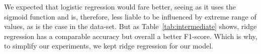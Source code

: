\documentclass[10pt,conference,compsocconf]{IEEEtran}
\begin{document}
\begin{comment}
\begin{table}[ht]
\centering
\resizebox{\columnwidth}{!}{%
\begin{tabular}{lrrr|r|r|r|}
\cline{5-7}
 &
  \multicolumn{1}{c}{} &
  \multicolumn{1}{l}{} &
  \multicolumn{1}{l|}{} &
  \multicolumn{1}{l|}{Training} &
  \multicolumn{1}{l|}{Validation} &
  \multicolumn{1}{l|}{Testing} \\ \cline{2-7} 
\multicolumn{1}{l|}{} &
  \multicolumn{3}{c|}{Parameters} &
  \multicolumn{1}{l|}{F1-score} &
  \multicolumn{1}{l|}{F1-score} &
  \multicolumn{1}{l|}{F1-score} \\ \hline
\multicolumn{1}{|l|}{Methods} &
  \multicolumn{1}{l|}{Gamma} &
  \multicolumn{1}{l|}{Lambda} &
  \multicolumn{1}{l|}{Max\_iters} &
  \multicolumn{1}{l|}{Accuracy} &
  \multicolumn{1}{l|}{Accuracy} &
  \multicolumn{1}{l|}{Accuracy} \\ \hline
\multicolumn{1}{|l|}{\multirow{2}{*}{\begin{tabular}[c]{@{}l@{}}Logistic \\ regression\end{tabular}}} &
  \multicolumn{1}{r|}{0.5} &
  \multicolumn{1}{r|}{-} &
  10000 &
  71.20\% &
  71.43\% &
  71.20\% \\
\multicolumn{1}{|l|}{} &
  \multicolumn{1}{r|}{} &
  \multicolumn{1}{r|}{} &
   &
  80.10\% &
  81.66\% &
  80.80\% \\ \hline
\multicolumn{1}{|l|}{\multirow{2}{*}{Ridge Regression}} &
  \multicolumn{1}{r|}{-} &
  \multicolumn{1}{r|}{1e-4} &
  - &
  72.97\% &
  72.70\% &
  73.40\% \\
\multicolumn{1}{|l|}{} &
  \multicolumn{1}{r|}{} &
  \multicolumn{1}{r|}{} &
   &
  82.22\% &
  82.00\% &
  80.30\% \\ \hline
\end{tabular}%
}
\caption{Parameters, F1-score and accuracy results after preprocessing the data.}
\label{tab:intermediate}
\end{table}
\end{comment}

\FloatBarrier
We expected that logistic regression would fare better, seeing as it uses 
the sigmoid function and is, therefore, less liable to be influenced by extreme 
range of values, as is the case in the data-set. 
But as Table~\ref{tab:intermediate} shows, ridge regression has a comparable
accuracy but overall a better F1-score. Which is why, to simplify our 
experiments, we kept ridge regression for our model.
\end{document}
